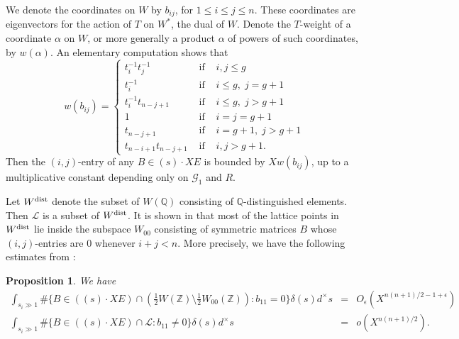 \documentclass[11pt]{article}
\def\Z{{\mathbb Z}}
\def\dist{{\rm dist}}
\def\Q{{\mathbb Q}}
\def\Z{{\mathbb Z}}
\def\Q{{\mathbb Q}}
\def\GG{{\mathcal G}}
\def\LL{{\mathcal L}}
\newtheorem{proposition}[theorem]{Proposition}
\begin{document}
We denote the coordinates on $W$ by $b_{ij}$, for $1\leq i\leq j\leq
n$. These coordinates are eigenvectors for the action of $T$ on $W^*$,
the dual of $W$. Denote the $T$-weight of a coordinate $\alpha$ on
$W$, or more generally a product $\alpha$ of powers of such
coordinates, by $w(\alpha)$. An elementary computation shows that
\begin{equation}\label{wbij}
w(b_{ij})=\left\{
\begin{array}{rcl}
t_i^{-1}t_j^{-1} &\mbox{ if }& i,j\leq g\\
t_i^{-1} &\mbox{ if }& i\leq g,\;j=g+1\\
t_i^{-1}t_{n-j+1} &\mbox{ if }& i\leq g,\; j>g+1\\
1 &\mbox{ if }& i=j=g+1\\
t_{n-j+1} &\mbox{ if }& i=g+1,\;j>g+1\\
t_{n-i+1}t_{n-j+1} &\mbox{ if }& i,j>g+1.
\end{array}
\right.
\end{equation}
Then the $(i,j)$-entry of any $B\in (s)\cdot XE$ is bounded by
$Xw(b_{ij})$, up to a multiplicative constant depending only on $\GG_1$
and $R$.

Let $W^\dist$ denote the subset of $W(\Q)$ consisting of
$\Q$-distinguished elements. Then $\LL$ is a subset of $W^\dist$. It
is shown in \cite[\S10.2]{BG2} that most of the lattice points in
$W^\dist$ lie inside the subspace $W_{00}$ consisting of symmetric
matrices $B$ whose $(i,j)$-entries are 0 whenever $i+j<n$. More
precisely, we have the following estimates from \cite[Propositions~10.5 and 10.7]{BG2}:

\begin{proposition}\label{prop:bg2}
We have
\begin{eqnarray}
  \int_{s_i\gg 1} \#\{B\in((s)\cdot XE)\cap({\textstyle\frac12} W(\Z)\setminus{\textstyle\frac12} W_{00}(\Z)):b_{11}=0\}\delta(s)d^\times s &=& O_\epsilon(X^{n(n+1)/2-1+\epsilon}) \\
  \label{eq:selbergpre}\int_{s_i\gg 1} \#\{B\in((s)\cdot XE)\cap\LL:b_{11}\neq 0\}\delta(s)d^\times s &=& o(X^{n(n+1)/2}).
\end{eqnarray}
\end{proposition}
\end{document}
